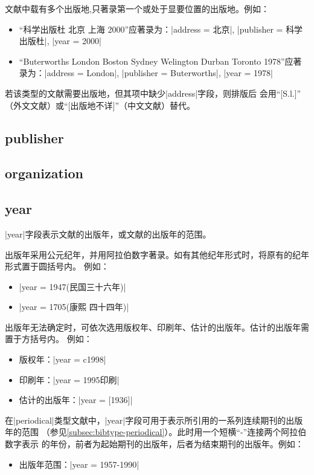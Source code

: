 文献中载有多个出版地,只著录第一个或处于显要位置的出版地。例如：
\begin{itemize}
\item ``科学出版杜 北京 上海 2000''应著录为：|address = {北京}|, 
  |publisher = {科学出版杜}|, |year = {2000}|
\item ``Buterworths London Boston Sydney Welington Durban Toronto 1978''应著
  录为：|address = {London}|, |publisher = {Buterworths}|, |year = {1978}|
\end{itemize}

若该类型的文献需要出版地，但其{\BibTeX}项中缺少|address|字段，则{\BibTeX}排版后
会用``[S.l.]'' （外文文献）或``[出版地不详]''（中文文献）替代。

\subsection{publisher}\label{subsec:bibfield-publisher}

\subsection{organization}\label{subsec:bibfield-organization}

\subsection{year}\label{subsec:bibfield-year}

|year|字段表示文献的出版年，或文献的出版年的范围。

出版年采用公元纪年，并用阿拉伯数字著录。如有其他纪年形式时，将原有的纪年形式置于圆括号内。
例如：
\begin{itemize}
\item |year = {1947(民国三十六年)}|
\item |year = {1705(康熙 四十四年)}|
\end{itemize}

出版年无法确定时，可依次选用版权年、印刷年、估计的出版年。估计的出版年需置于方括号内。
例如：
\begin{itemize}
\item 版权年：|year = {c1998}|
\item 印刷年：|year = 1995印刷|
\item 估计的出版年：|year = {[1936]}|
\end{itemize}

在|periodical|类型文献中，|year|字段可用于表示所引用的一系列连续期刊的出版年的范围
（参见\ref{subsec:bibtype-periodical}）。此时用一个短横``-''连接两个阿拉伯数字表示
的年份，前者为起始期刊的出版年，后者为结束期刊的出版年。例如：
\begin{itemize}
\item 出版年范围：|year = {1957-1990}|
\end{itemize}

